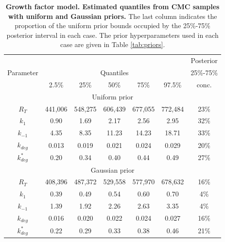 \begin{table}
\begin{tabular}{c|ccccc|c}
\toprule
&&&&&&                                         Posterior \\
Parameter &  \multicolumn{5}{c}{Quantiles} &   25\%-75\% \\
          & 2.5\% & 25\% & 50\% & 75\% & 97.5\% & conc.\\
\toprule
\multicolumn{7}{c}{Uniform prior} \\
\toprule
$R_T$       &  441,006 & 548,275 & 606,439 & 677,055 & 772,484 & 23\%\\
$k_1$       &  0.90 & 1.69 & 2.17 & 2.56 & 2.95 & 32\%\\
$k_{-1}$    & 4.35 & 8.35 & 11.23 & 14.23 & 18.71 & 33\%\\
$k_{deg}$   & 0.013 & 0.019 & 0.021 & 0.024 & 0.029 & 20\%\\
$k^*_{deg}$ & 0.20 & 0.34 & 0.40 & 0.44 & 0.49 & 27\%\\
\toprule
\multicolumn{7}{c}{Gaussian prior} \\
\toprule
$R_T$       & 408,396 & 487,372 & 529,558 & 577,970 & 678,632 & 16\%\\
$k_1$       & 0.39 & 0.49 & 0.54 & 0.60 & 0.70 & 4\%\\
$k_{-1}$    & 1.39 & 1.92 & 2.26 & 2.63 & 3.35 & 4\%\\
$k_{deg}$   & 0.016 & 0.020 & 0.022 & 0.024 & 0.027 & 16\%\\
$k^*_{deg}$ & 0.22 & 0.29 & 0.33 & 0.38 & 0.46 & 21\%\\
\end{tabular}
\caption{\textbf{Growth factor model. Estimated quantiles from CMC samples with uniform and Gaussian priors.} The last column indicates the proportion of the uniform prior bounds occupied by the 25\%-75\% posterior interval in each case. The prior hyperparameters used in each case are given in Table \ref{tab:priors}.}
\label{tab:growth_factor_results}
\end{table}

